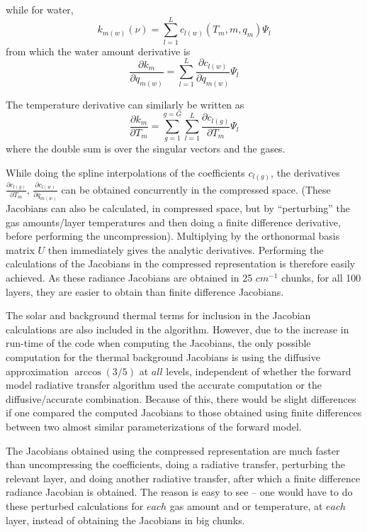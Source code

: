 \documentclass[11pt]{article}
\begin{document}
while for water, 
\begin{equation}
k_{m(w)}(\nu) = \sum_{l=1}^{L} c_{l(w)}(T_{m},m,q_{m}) \Psi_{l}
\end{equation}
from which the water amount derivative is 
\begin{equation}
\frac{\partial k_{m}}{\partial q_{m(w)}} = 
\sum_{l=1}^{L} \frac{\partial c_{l(w)}}{\partial q_{m(w)}} \Psi_{l}
\end{equation}

The temperature derivative can similarly be written as
\begin{equation}
\frac{\partial k_{m}}{\partial T_{m}} = 
\sum_{g=1}^{g=G} \sum_{l=1}^{L} 
\frac{\partial c_{l(g)}}{\partial T_{m}} \Psi_{l}
\end{equation}
where the double sum is over the singular vectors and the gases.

While doing the spline interpolations of the coefficients $c_{l(g)}$,
the derivatives $\frac{\partial c_{l(g)}}{\partial T_{m}}$,
$\frac{\partial c_{l(w)}}{\partial q_{m(w)}}$ can be obtained
concurrently \cite{wil:89} in the compressed space.  (These
Jacobians can also be calculated, in compressed space, but by
``perturbing'' the gas amounts/layer temperatures and then doing a
finite difference derivative, before performing the uncompression).
Multiplying by the orthonormal basis matrix $U$ then immediately gives
the analytic derivatives.  Performing the calculations of the
Jacobians in the compressed representation is therefore easily
achieved. As these radiance Jacobians are obtained in 25 $cm^{-1}$
chunks, for all 100 layers, they are easier to obtain than finite
difference Jacobians.  

The solar and background thermal terms for inclusion in the Jacobian
calculations are also included in the algorithm. However, due to the
increase in run-time of the code when computing the Jacobians, the
only possible computation for the thermal background Jacobians is
using the diffusive approximation $\arccos(3/5)$ at $all$ levels,
independent of whether the forward model radiative transfer algorithm
used the accurate computation or the diffusive/accurate combination.
Because of this, there would be slight differences if one compared the
computed Jacobians to those obtained using finite differences between
two almost similar parameterizations of the forward model.

The Jacobians obtained using the compressed representation are much
faster than uncompressing the coefficients, doing a radiative
transfer, perturbing the relevant layer, and doing another radiative
transfer, after which a finite difference radiance Jacobian is
obtained. The reason is easy to see -- one would have to do these
perturbed calculations for $each$ gas amount and or temperature, 
at $each$ layer, instead of obtaining the Jacobians in big chunks.
\end{document}
